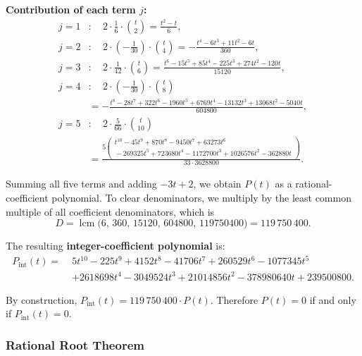 \documentclass[12pt,a4paper]{article}
\theoremstyle{plain}
\theoremstyle{definition}
\begin{document}
\textbf{Contribution of each term $j$:}
\begin{align*}
  j=1&:\quad 2 \cdot \tfrac{1}{6} \cdot \binom{t}{2}
       = \frac{t^2 - t}{6}, \\
  j=2&:\quad 2 \cdot \left(-\tfrac{1}{30}\right) \cdot \binom{t}{4}
       = -\frac{t^4 - 6t^3 + 11t^2 - 6t}{360}, \\
  j=3&:\quad 2 \cdot \tfrac{1}{42} \cdot \binom{t}{6}
       = \frac{t^6 - 15t^5 + 85t^4 - 225t^3 + 274t^2 - 120t}{15120}, \\
  j=4&:\quad 2 \cdot \left(-\tfrac{1}{30}\right) \cdot \binom{t}{8} \\
      &= -\frac{t^8 - 28t^7 + 322t^6 - 1960t^5 + 6769t^4
               - 13132t^3 + 13068t^2 - 5040t}{604800}, \\
  j=5&:\quad 2 \cdot \tfrac{5}{66} \cdot \binom{t}{10} \\
      &= \frac{5\left(\begin{gathered}
               t^{10} - 45t^9 + 870t^8 - 9450t^7 + 63273t^6 \\
               {}- 269325t^5 + 723680t^4 - 1172700t^3 + 1026576t^2 - 362880t
             \end{gathered}\right)}{33 \cdot 3628800}.
\end{align*}

Summing all five terms and adding $-3t + 2$, we obtain $P(t)$ as a
rational-coefficient polynomial.  To clear denominators, we multiply
by the least common multiple of all coefficient denominators, which is
\[
  D = \operatorname{lcm}\bigl(6,\, 360,\, 15120,\, 604800,\,
       119750400\bigr) = 119\,750\,400.
\]

The resulting \textbf{integer-coefficient polynomial} is:
\begin{equation}\label{eq:Pint}
\boxed{
\begin{aligned}
  P_{\mathrm{int}}(t) =\; &5t^{10} - 225t^9 + 4152t^8 - 41706t^7
                           + 260529t^6 - 1077345t^5 \\
                         &+ 2618698t^4 - 3049524t^3
                           + 21014856t^2 - 378980640t + 239500800.
\end{aligned}}
\end{equation}

By construction, $P_{\mathrm{int}}(t) = 119\,750\,400 \cdot P(t)$.
Therefore $P(t) = 0$ if and only if $P_{\mathrm{int}}(t) = 0$.

\subsubsection{Rational Root Theorem}
\label{sec:rational-root-theorem}
\end{document}
